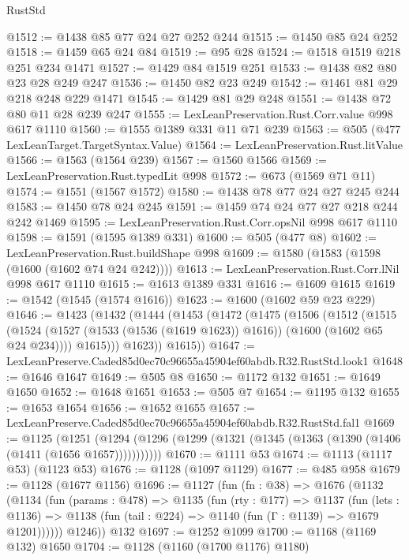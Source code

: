 \begin{lexlean}{RustStd}
\begin{coremodule}
@1512 := @1438 @85 @77 @24 @27 @252 @244
@1515 := @1450 @85 @24 @252
@1518 := @1459 @65 @24 @84
@1519 := @95 @28
@1524 := @1518 @1519 @218 @251 @234 @1471
@1527 := @1429 @84 @1519 @251
@1533 := @1438 @82 @80 @23 @28 @249 @247
@1536 := @1450 @82 @23 @249
@1542 := @1461 @81 @29 @218 @248 @229 @1471
@1545 := @1429 @81 @29 @248
@1551 := @1438 @72 @80 @11 @28 @239 @247
@1555 := LexLeanPreservation.Rust.Corr.value @998 @617 @1110
@1560 := @1555 @1389 @331 @11 @71 @239
@1563 := @505 (@477 LexLeanTarget.TargetSyntax.Value)
@1564 := LexLeanPreservation.Rust.litValue
@1566 := @1563 (@1564 @239)
@1567 := @1560 @1566
@1569 := LexLeanPreservation.Rust.typedLit @998
@1572 := @673 (@1569 @71 @11)
@1574 := @1551 (@1567 @1572)
@1580 := @1438 @78 @77 @24 @27 @245 @244
@1583 := @1450 @78 @24 @245
@1591 := @1459 @74 @24 @77 @27 @218 @244 @242 @1469
@1595 := LexLeanPreservation.Rust.Corr.opsNil @998 @617 @1110
@1598 := @1591 (@1595 @1389 @331)
@1600 := @505 (@477 @8)
@1602 := LexLeanPreservation.Rust.buildShape @998
@1609 := @1580 (@1583 (@1598 (@1600 (@1602 @74 @24 @242))))
@1613 := LexLeanPreservation.Rust.Corr.lNil @998 @617 @1110
@1615 := @1613 @1389 @331
@1616 := @1609 @1615
@1619 := @1542 (@1545 (@1574 @1616))
@1623 := @1600 (@1602 @59 @23 @229)
@1646 := @1423
    (@1432
      (@1444
        (@1453
          (@1472
            (@1475
              (@1506
                (@1512
                  (@1515
                    (@1524
                      (@1527 (@1533 (@1536 (@1619 @1623)) @1616))
                      (@1600 (@1602 @65 @24 @234))))
                  @1615)))
            @1623))
        @1615))
@1647 := LexLeanPreserve.Caded85d0ec70c96655a45904ef60abdb.R32.RustStd.look1
@1648 := @1646 @1647
@1649 := @505 @8
@1650 := @1172 @132
@1651 := @1649 @1650
@1652 := @1648 @1651
@1653 := @505 @7
@1654 := @1195 @132
@1655 := @1653 @1654
@1656 := @1652 @1655
@1657 := LexLeanPreserve.Caded85d0ec70c96655a45904ef60abdb.R32.RustStd.fal1
@1669 := @1125
    (@1251 (@1294 (@1296 (@1299 (@1321 (@1345 (@1363 (@1390 (@1406 (@1411 (@1656 @1657)))))))))))
@1670 := @1111 @53
@1674 := @1113 (@1117 @53) (@1123 @53)
@1676 := @1128 (@1097 @1129)
@1677 := @485 @958
@1679 := @1128 (@1677 @1156)
@1696 := @1127
    (fun (fn : @38) =>
    @1676
      (@1132
        (@1134
          (fun (params : @478) =>
          @1135
            (fun (rty : @177) =>
            @1137
              (fun (lets : @1136) =>
              @1138 (fun (tail : @224) => @1140 (fun (Γ : @1139) => @1679 @1201))))))
        @1246))
    @132
@1697 := @1252 @1099
@1700 := @1168 (@1169 @132) @1650
@1704 := @1128 (@1160 (@1700 @1176) @1180)

\end{coremodule}
\end{lexlean}
